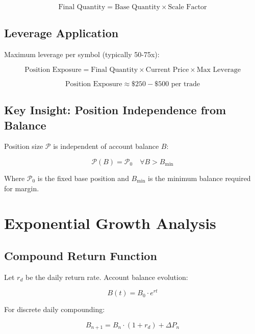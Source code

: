 \documentclass{article}
\begin{document}
\begin{equation}
\text{Final Quantity} = \text{Base Quantity} \times \text{Scale Factor}
\end{equation}

\subsection{Leverage Application}

Maximum leverage per symbol (typically 50-75x):

\begin{equation}
\text{Position Exposure} = \text{Final Quantity} \times \text{Current Price} \times \text{Max Leverage}
\end{equation}

\begin{equation}
\text{Position Exposure} \approx \$250 - \$500 \text{ per trade}
\end{equation}

\subsection{Key Insight: Position Independence from Balance}

Position size $\mathcal{P}$ is independent of account balance $B$:

\begin{equation}
\mathcal{P}(B) = \mathcal{P}_0 \quad \forall B > B_{\text{min}}
\end{equation}

Where $\mathcal{P}_0$ is the fixed base position and $B_{\text{min}}$ is the minimum balance required for margin.

\section{Exponential Growth Analysis}

\subsection{Compound Return Function}

Let $r_d$ be the daily return rate. Account balance evolution:

\begin{equation}
B(t) = B_0 \cdot e^{rt}
\end{equation}

For discrete daily compounding:

\begin{equation}
B_{n+1} = B_n \cdot (1 + r_d) + \Delta P_n
\end{equation}
\end{document}
